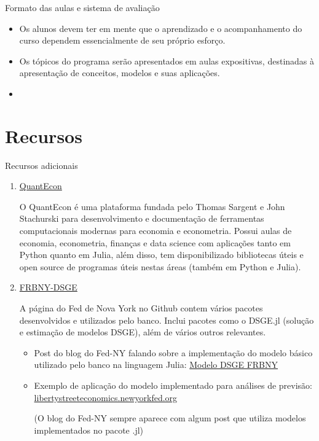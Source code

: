 \documentclass[10pt]{beamer}
\begin{document}
\begin{frame}{Formato das aulas e sistema de avaliação}
    \begin{itemize}
        \item Os alunos devem ter em mente que o aprendizado e o acompanhamento do curso dependem essencialmente de seu próprio esforço.\bigskip

        \item Os tópicos do programa serão apresentados em aulas expositivas, destinadas à apresentação de conceitos, modelos e suas aplicações.\bigskip

        \item[\emoji{warning}] 
    \end{itemize}
\end{frame}

\section{Recursos}
\begin{frame}{Recursos adicionais}
    \begin{enumerate}
        \item \href{https://quantecon.org/}{QuantEcon}\medskip
        
        O QuantEcon é uma plataforma fundada pelo Thomas Sargent e John Stachurski para desenvolvimento e documentação de ferramentas computacionais modernas para economia e econometria. Possui aulas de economia, econometria, finanças e data science com aplicações tanto em Python quanto em Julia, além disso, tem disponibilizado bibliotecas úteis e open source de programas úteis nestas áreas (também em Python e Julia).\medskip

        \item \href{https://github.com/FRBNY-DSGE}{FRBNY-DSGE}
        
        A página do Fed de Nova York no Github contem vários pacotes desenvolvidos e utilizados pelo banco. Inclui pacotes como o DSGE.jl (solução e estimação de modelos DSGE), além de vários outros relevantes.\medskip
        \begin{itemize}
            \item Post do blog do Fed-NY falando sobre a implementação do modelo básico utilizado pelo banco na linguagem Julia: \href{https://libertystreeteconomics.newyorkfed.org/2015/12/the-frbny-dsge-model-meets-julia/}{Modelo DSGE FRBNY}\medskip
            \item Exemplo de aplicação do modelo implementado para análises de previsão: \href{https://libertystreeteconomics.newyorkfed.org/2015/05/the-frbny-dsge-model-forecast-april-2015/}{libertystreeteconomics.newyorkfed.org}
            
            (O blog do Fed-NY sempre aparece com algum post que utiliza modelos implementados no pacote .jl)
        \end{itemize}
    \end{enumerate}
\end{frame}
\end{document}
